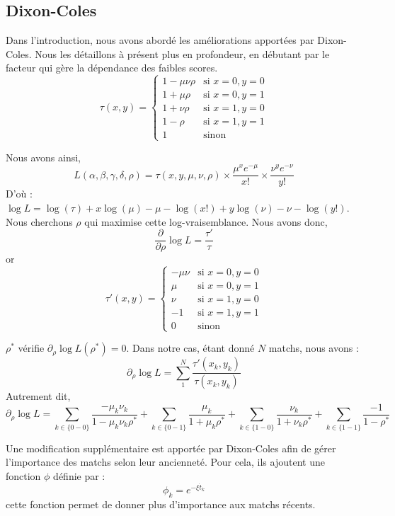 \subsection{Dixon-Coles}
Dans l'introduction, nous avons abordé les améliorations apportées par Dixon-Coles. 
Nous les détaillons à présent plus en profondeur, en débutant par le facteur 
qui gère la dépendance des faibles scores.
\[
\tau(x, y) = 
\begin{cases} 
    1 - \mu \nu \rho & \text{si } x=0, y=0 \\ 
    1 + \mu \rho     & \text{si } x=0, y=1 \\ 
    1 + \nu \rho         & \text{si } x=1, y=0 \\ 
    1 - \rho             & \text{si } x=1, y=1 \\ 
    1                    & \text{sinon}
\end{cases}
\]

\noindent Nous avons ainsi, 
$$L(\alpha, \beta, \gamma, \delta, \rho) = \tau(x, y, \mu, \nu, \rho) \times 
\frac{\mu^x e^{-\mu}}{x!} \times \frac{\nu^y e^{-\nu}}{y!}$$
D'où : $\log L=\log(\tau)+x\log(\mu)-\mu-\log(x!) + y\log(\nu)-\nu-\log(y!)$.\\ 
Nous cherchons $\rho$ qui maximise cette log-vraisemblance. Nous avons donc, 
$$\frac{\partial}{\partial\rho}\log L = \frac{\tau'}{\tau} $$ 
or 
\[\tau'(x,y)=
\begin{cases} 
    - \mu \nu  & \text{si } x=0, y=0 \\ 
    \mu        & \text{si } x=0, y=1 \\ 
    \nu        & \text{si } x=1, y=0 \\ 
    - 1        & \text{si } x=1, y=1 \\ 
    0          & \text{sinon}
\end{cases}
\]

$\rho^*$ vérifie $\partial_\rho \log L(\rho^*) = 0$. 
Dans notre cas, étant donné $N$ matchs, nous avons : 
$$\partial_\rho \log L = \sum_{1}^{N}\frac{\tau'(x_k,y_k)}{\tau(x_k,y_k)}$$
Autrement dit,
$$ \partial_\rho \log L =
\sum_{k \in \{0-0\}} \frac{-\mu_k \nu_k}{1 - \mu_k \nu_k \rho^*} 
+ \sum_{k \in \{0-1\}} \frac{\mu_k}{1 + \mu_k \rho^*} 
+ \sum_{k \in \{1-0\}} \frac{\nu_k}{1 + \nu_k \rho^*} 
+ \sum_{k \in \{1-1\}} \frac{-1}{1 - \rho^*}$$

Une modification supplémentaire est apportée par Dixon-Coles afin de gérer l'importance des matchs 
selon leur ancienneté. Pour cela, ils ajoutent une fonction $\phi$ définie par : 
$$\phi_k = e^{-\xi \dot t_k}$$ 
cette fonction permet de donner plus d'importance aux matchs récents. 

